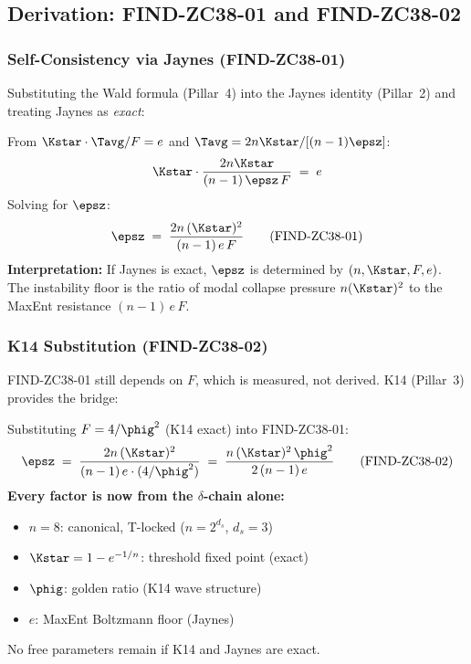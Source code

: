 \documentclass[12pt, a4paper]{article}
\begin{document}
\subsection{Derivation: FIND-ZC38-01 and FIND-ZC38-02}
\label{sec:derivation}

\subsubsection{Self-Consistency via Jaynes (FIND-ZC38-01)}

Substituting the Wald formula (Pillar~4) into the Jaynes identity
(Pillar~2) and treating Jaynes as \emph{exact}:

\begin{derivedbox}[title={FIND-ZC38-01: Jaynes Self-Consistency Equation for $\epsz$}]
From $\Kstar \cdot \Tavg / F = e$ and $\Tavg = 2n\Kstar/[(n-1)\epsz]$:
\[
  \Kstar \cdot \frac{2n\Kstar}{(n-1)\,\epsz\,F} \;=\; e
\]
Solving for $\epsz$:
\[
  \epsz \;=\; \frac{2n\,(\Kstar)^2}{(n-1)\,e\,F}
  \tag{FIND-ZC38-01}
\]
\textbf{Interpretation:} If Jaynes is exact, $\epsz$ is determined by $(n, \Kstar, F, e)$.
The instability floor is the ratio of modal collapse pressure $n(\Kstar)^2$
to the MaxEnt resistance $(n-1)\,e\,F$.
\end{derivedbox}

\subsubsection{K14 Substitution (FIND-ZC38-02)}

FIND-ZC38-01 still depends on $F$, which is measured, not derived.
K14 (Pillar~3) provides the bridge:

\begin{derivedbox}[title={FIND-ZC38-02: Eliminating $F$ via K14}]
Substituting $F = 4/\phig^2$ (K14 exact) into FIND-ZC38-01:
\[
  \epsz \;=\; \frac{2n\,(\Kstar)^2}{(n-1)\,e \cdot (4/\phig^2)}
  \;=\; \frac{n\,(\Kstar)^2\,\phig^2}{2\,(n-1)\,e}
  \tag{FIND-ZC38-02}
\]
\textbf{Every factor is now from the $\delta$-chain alone:}
\begin{itemize}[noitemsep,leftmargin=2em]
  \item $n = 8$: canonical, T-locked ($n = 2^{d_s}$, $d_s = 3$)
  \item $\Kstar = 1 - e^{-1/n}$: threshold fixed point (exact)
  \item $\phig$: golden ratio (K14 wave structure)
  \item $e$: MaxEnt Boltzmann floor (Jaynes)
\end{itemize}
No free parameters remain if K14 and Jaynes are exact.
\end{derivedbox}
\end{document}
